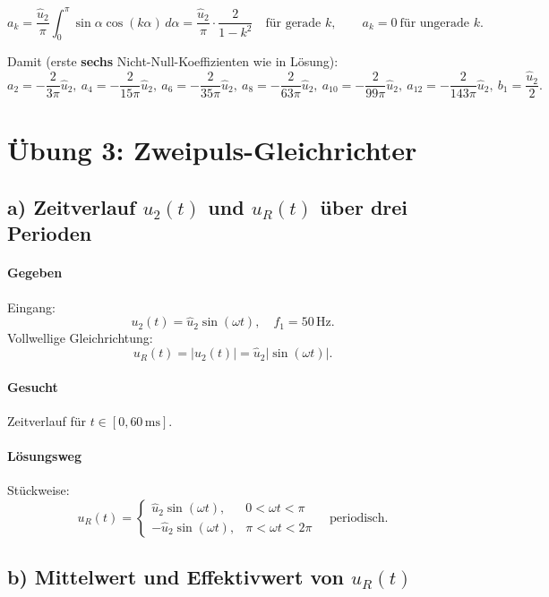 \[
a_k=\frac{\hat u_2}{\pi}\int_0^{\pi}\sin\alpha\cos(k\alpha)\,d\alpha
=
\frac{\hat u_2}{\pi}\cdot\frac{2}{1-k^2}
\quad\text{für gerade }k,
\qquad
a_k=0\ \text{für ungerade }k.
\]

Damit (erste \textbf{sechs} Nicht-Null-Koeffizienten wie in Lösung):
\[
\boxed{
a_2=-\frac{2}{3\pi}\hat u_2,\ 
a_4=-\frac{2}{15\pi}\hat u_2,\ 
a_6=-\frac{2}{35\pi}\hat u_2,\ 
a_8=-\frac{2}{63\pi}\hat u_2,\ 
a_{10}=-\frac{2}{99\pi}\hat u_2,\ 
a_{12}=-\frac{2}{143\pi}\hat u_2,\ 
b_1=\frac{\hat u_2}{2}
}.
\]



\section{Übung 3: Zweipuls-Gleichrichter}

\subsection*{a) Zeitverlauf $u_2(t)$ und $u_R(t)$ über drei Perioden}

\paragraph{Gegeben}
Eingang:
\[
u_2(t)=\hat u_2\sin(\omega t),\quad f_1=50\,\mathrm{Hz}.
\]
Vollwellige Gleichrichtung:
\[
u_R(t)=|u_2(t)|=\hat u_2|\sin(\omega t)|.
\]

\paragraph{Gesucht}
Zeitverlauf für $t\in[0,60\,\mathrm{ms}]$.

\paragraph{Lösungsweg}
Stückweise:
\[
u_R(t)=
\begin{cases}
\hat u_2\sin(\omega t), & 0<\omega t<\pi\\
-\hat u_2\sin(\omega t), & \pi<\omega t<2\pi
\end{cases}
\quad\text{periodisch}.
\]

\subsection*{b) Mittelwert und Effektivwert von $u_R(t)$}

